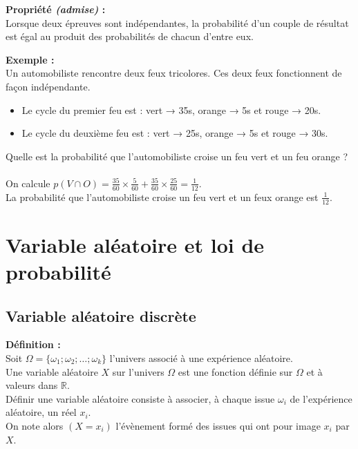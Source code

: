 \documentclass{article}
\begin{document}
\begin{mdframed}[style=proprieteStyle]
  \textbf{Propriété \emph{(admise)} :} ~\\
  Lorsque deux épreuves sont indépendantes, la probabilité d'un couple de résultat est égal au produit des probabilités de chacun d'entre eux.
\end{mdframed}

\textbf{Exemple :} ~\\
Un automobiliste rencontre deux feux tricolores. Ces deux feux fonctionnent de façon indépendante.
\begin{itemize}
  \item Le cycle du premier feu est : vert → 35s, orange → 5s et rouge → 20s.
  \item Le cycle du deuxième feu est : vert → 25s, orange → 5s et rouge → 30s.
\end{itemize}
Quelle est la probabilité que l'automobiliste croise un feu vert et un feu orange ? ~\\

On calcule $p(V\cap O)=\frac{35}{60}\times\frac{5}{60}+\frac{35}{60}\times\frac{25}{60}=\frac{1}{12}$.\\
La probabilité que l'automobiliste croise un feu vert et un feux orange est $\frac{1}{12}$.

\section{Variable aléatoire et loi de probabilité}

\subsection{Variable aléatoire discrète}

\begin{mdframed}[style=definitionStyle]
    \textbf{Définition :} ~\\
    Soit $\Omega=\{\omega_1;\omega_2;\dots;\omega_k\}$ l'univers associé à une expérience aléatoire. \\
    Une variable aléatoire $X$ sur l'univers $\Omega$ est une fonction définie sur $\Omega$ et à valeurs dans $\mathbb{R}$. \\
    Définir une variable aléatoire consiste à associer, à chaque issue $\omega_i$ de l'expérience aléatoire, un réel $x_i$. \\
    On note alors $\left(X=x_i\right)$ l'évènement formé des issues qui ont pour image $x_i$ par $X$.
\end{mdframed}
\end{document}
